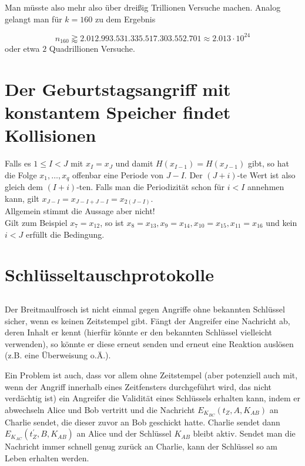 \documentclass{../crypto}
\begin{document}
Man müsste also mehr also über dreißig Trillionen
Versuche machen. Analog gelangt man für $k=160$ zu dem Ergebnis 

\begin{equation*}
   n_{160} \gtrapprox 2.012.993.531.335.517.303.552.701 \approx 2.013 \cdot 10^{24}
\end{equation*}
oder etwa $2$ Quadrillionen Versuche.

\section{Der Geburtstagsangriff mit konstantem Speicher findet Kollisionen}

Falls es $1 \le I < J$ mit $x_I = x_J$ und damit $H(x_{I-1}) = H(x_{J-1})$
gibt, so hat die Folge $x_1,\ldots,x_q$ offenbar eine Periode von $J - I$. Der
$(J+i)$-te Wert ist also gleich dem $(I+i)$-ten. Falls man die Periodizität
schon für $i < I$ annehmen kann, gilt $x_{J-I} = x_{J-I + J-I} = x_{2(J-I)}$.\\
Allgemein stimmt die Aussage aber nicht!\\ Gilt zum Beispiel $x_7 = x_{12}$, so
ist $x_8 = x_{13}, x_9 = x_{14},x_{10} = x_{15},x_{11} = x_{16}$ und kein $i <
J$ erfüllt die Bedingung.

\section{Schlüsseltauschprotokolle}
\subsection{}

Der Breitmaulfrosch ist nicht einmal gegen Angriffe ohne bekannten Schlüssel
sicher, wenn es keinen Zeitstempel gibt. Fängt der Angreifer eine Nachricht ab,
deren Inhalt er kennt (hierfür könnte er den bekannten Schlüssel vielleicht
verwenden), so könnte er diese erneut senden und erneut eine Reaktion auslösen
(z.B. eine Überweisung o.Ä.). 

Ein Problem ist auch, dass vor allem ohne Zeitstempel (aber potenziell auch mit,
wenn der Angriff innerhalb eines Zeitfensters durchgeführt wird, das nicht
verdächtig ist) ein Angreifer die Validität eines Schlüssels erhalten kann,
indem er abwechseln Alice und Bob vertritt und die Nachricht
$E_{K_{BC}}(t_Z, A, K_{AB})$ an Charlie sendet, die dieser zuvor an Bob
geschickt hatte. Charlie sendet dann $E_{K_{AC}}(t_Z^\prime, B, K_{AB})$ an
Alice und der Schlüssel $K_{AB}$ bleibt aktiv. Sendet man die Nachricht immer
schnell genug zurück an Charlie, kann der Schlüssel so am Leben erhalten werden.
\end{document}
